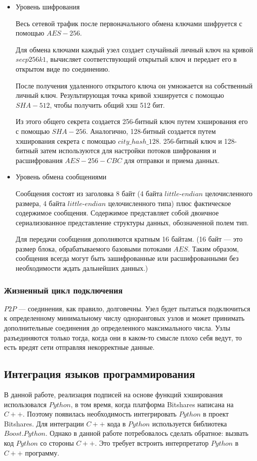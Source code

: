 \documentclass[a4paper, 14pt]{extarticle}
\begin{document}
\begin{itemize}
    \item Уровень шифрования

    Весь сетевой трафик после первоначального обмена ключами шифруется с помощью $AES-256$.

    Для обмена ключами каждый узел создает случайный личный ключ на кривой $secp256k1$, вычисляет соответствующий открытый ключ и передает его в открытом виде по соединению.

    После получения удаленного открытого ключа он умножается на собственный личный ключ. Результирующая точка кривой хэшируется с помощью $SHA-512$, чтобы получить общий хэш 512 бит.

    Из этого общего секрета создается 256-битный ключ путем хэширования его с помощью $SHA-256$. Аналогично, 128-битный создается путем хэширования секрета с помощью $city\_hash\_128$. 256-битный ключ и 128-битный затем используются для настройки потоков шифрования и расшифрования $AES-256-CBC$ для отправки и приема данных.
    \item Уровень обмена сообщениями

    Сообщения состоят из заголовка 8 байт (4 байта $little$-$endian$ целочисленного размера, 4 байта $little$-$endian$ целочисленного типа) плюс фактическое содержимое сообщения. Содержимое представляет собой двоичное сериализованное представление структуры данных, обозначенной полем тип.

    Для передачи сообщения дополняются кратным 16 байтам. (16 байт --- это размер блока, обрабатываемого базовыми потоками $AES$. Таким образом, сообщения всегда могут быть зашифрованные или расшифрованными без необходимости ждать дальнейших данных.)
\end{itemize}

\subsubsection{Жизненный цикл подключения}
$P2P$ --- соединения, как правило, долговечны. Узел будет пытаться подключиться к определенному минимальному числу одноранговых узлов и может принимать дополнительные соединения до определенного максимального числа. Узлы разъединяются только тогда, когда они в каком-то смысле плохо себя ведут, то есть вредят сети отправляя некорректные данные.

\subsection{Интеграция языков программирования}
В данной работе, реализация подписей на основе функций хэширования использовался $Python$, в том время, когда платформа Bitshares написана на $C++$. Поэтому появилась необходимость интегрировать $Python$ в проект Bitshares.
Для интеграции $C++$ кода в $Python$ используется библиотека $Boost.Python$. Однако в данной работе потребовалось сделать обратное: вызвать код $Python$ со стороны $C++$. Это требует встроить интерпретатор $Python$ в $C++$ программу.
\end{document}
